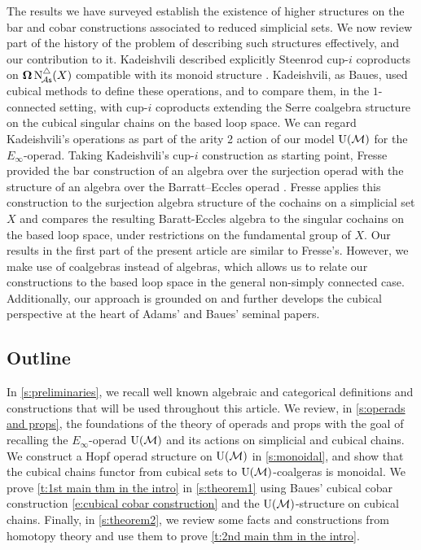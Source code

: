 The results we have surveyed establish the existence of higher structures on the bar and cobar constructions associated to reduced simplicial sets.
We now review part of the history of the problem of describing such structures effectively, and our contribution to it.
Kadeishvili described explicitly Steenrod cup-$i$ coproducts on $\operatorname{\mathbf{\Omega}} \operatorname{N^{\triangle}_{\!{\mathcal{A}\mathsf{s}}}}(X)$ compatible with its monoid structure \cite{kadeishvili1999coproducts, kadeishvili2003cupi}.
Kadeishvili, as Baues, used cubical methods to define these operations, and to compare them, in the $1$-connected setting, with cup-$i$ coproducts extending the Serre coalgebra structure on the cubical singular chains on the based loop space.
We can regard Kadeishvili's operations as part of the arity 2 action of our model ${\operatorname{U}(\mathcal{M})}$ for the $E_{\infty}$-operad.
Taking Kadeishvili's cup-$i$ construction as starting point, Fresse provided the bar construction of an algebra over the surjection operad with the structure of an algebra over the Barratt–Eccles operad \cite{fresse2003hopf}.
Fresse applies this construction to the surjection algebra structure of the cochains on a simplicial set $X$ and compares the resulting Baratt-Eccles algebra to the singular cochains on the based loop space, under restrictions on the fundamental group of $X$.
Our results in the first part of the present article are similar to Fresse's.
However, we make use of coalgebras instead of algebras, which allows us to relate our constructions to the based loop space in the general non-simply connected case.
Additionally, our approach is grounded on and further develops the cubical perspective at the heart of Adams' and Baues' seminal papers.

\subsection*{Outline}

In \cref{s:preliminaries}, we recall well known algebraic and categorical definitions and constructions that will be used throughout this article.
We review, in \cref{s:operads and props}, the foundations of the theory of operads and props with the goal of recalling the $E_{\infty}$-operad ${\operatorname{U}(\mathcal{M})}$ and its actions on simplicial and cubical chains.
We construct a Hopf operad structure on ${\operatorname{U}(\mathcal{M})}$ in \cref{s:monoidal}, and show that the cubical chains functor from cubical sets to ${\operatorname{U}(\mathcal{M})}$-coalgeras is monoidal.
We prove \cref{t:1st main thm in the intro} in \cref{s:theorem1} using Baues' cubical cobar construction \eqref{e:cubical cobar construction} and the ${\operatorname{U}(\mathcal{M})}$-structure on cubical chains.
Finally, in \cref{s:theorem2}, we review some facts and constructions from homotopy theory and use them to prove \cref{t:2nd main thm in the intro}.